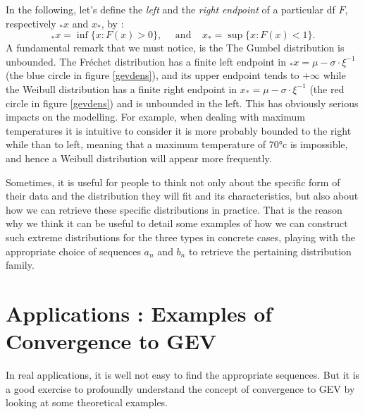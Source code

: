 \documentclass[11pt,a4paper,openany ]{book}
\begin{document}
In the following, let's define the \emph{left} and the \emph{right} \emph{endpoint} of a particular df $F$, respectively $_*x$ and $x_*$, by :
\begin{equation*}
_*x=\inf\{x:F(x)>0\}, \ \ \ \ \ \ \text{and} \ \ \ \ \  x_*=\sup\{x:F(x)<1\}.
\end{equation*}
A fundamental remark that we must notice, is the  The Gumbel distribution is unbounded. The Fréchet distribution has a finite left endpoint in $_*x=\mu-\sigma\cdot\xi^{-1}$ (the blue circle in figure \ref{gevdens}), and its upper endpoint tends to $+\infty$ while the Weibull distribution has a finite right endpoint in $x_*=\mu-\sigma\cdot\xi^{-1}$ (the red circle in figure \ref{gevdens}) and is unbounded in the left. This has obviously serious impacts on the modelling. For example, when dealing with maximum temperatures it is intuitive to consider it is more probably bounded to the right while than to left, meaning that a maximum temperature of 70°c is impossible, and hence a Weibull distribution will appear more frequently. 


\vspace{.3cm}
Sometimes, it is useful for people to think not only about the
specific form of their data and the distribution they will fit and its characteristics, but also about how we can retrieve these specific distributions in practice. That is the 
reason why we think it can be useful to detail some examples of how we can construct such extreme distributions for the three types in concrete cases, playing with the appropriate choice of 
sequences $a_n$ and $b_n$ to retrieve the pertaining distribution family.



\section{Applications : Examples of Convergence to GEV}\label{sec::appconcrete}

In real applications, it is well not easy to find the appropriate sequences. But it is a good exercise to profoundly understand the concept of convergence to GEV by looking at some theoretical examples.
\end{document}
